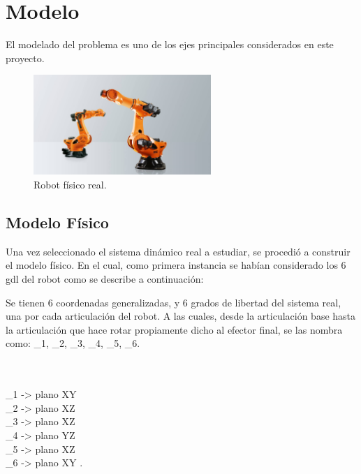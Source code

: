 \documentclass{aleph-revista}
\begin{document}
\section{Modelo}

El modelado del problema es uno de los ejes principales considerados en este proyecto.

\begin{figure}[H]
    \centering
    \includegraphics[width=0.60\textwidth]{Imagenes/modelo_3.jpg}
    \caption{Robot físico real.}
    \label{fig:etiqueta de la figura}
\end{figure}

\subsection{Modelo Físico}

Una vez seleccionado el sistema dinámico real a estudiar, se procedió a construir el modelo físico. En el cual, como primera instancia se habían considerado los 6 gdl del robot como se describe a continuación:

Se tienen 6 coordenadas generalizadas, y 6 grados de libertad del sistema real, una por cada articulación del robot. A las cuales, desde la articulación base hasta la articulación que hace rotar propiamente dicho al efector final, se las nombra como: \theta_1, \theta_2, \theta_3, \theta_4, \theta_5, \theta_6.

 \\
 \\
\theta_1  ->  plano XY\\
\theta_2  ->  plano XZ\\
\theta_3  ->  plano XZ\\
\theta_4  ->  plano YZ\\
\theta_5  ->  plano XZ\\
\theta_6  ->  plano XY .\\
\end{document}

